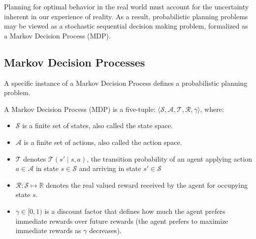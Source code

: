 \documentclass[11pt]{article}
\begin{document}
%
%
%
%
%

Planning for optimal behavior in the real world must account for the uncertainty inherent in our experience of reality. As a result, probabilistic planning problems may be viewed as a stochastic sequential decision making problem, formalized as a Markov Decision Process (MDP).

\subsection{Markov Decision Processes}

A specific instance of a Markov Decision Process defines a probabilistic planning problem. \\

{ A \textup{Markov Decision Process (MDP)} is a five-tuple: $\langle \mathcal{S},
\mathcal{A}, \mathcal{T}, \mathcal{R}, \gamma \rangle$, where:
\begin{itemize}
\item $\mathcal{S}$ is a finite set of states, also called the \textup{state space}.
\item $\mathcal{A}$ is a finite set of actions, also called the \textup{action space}.
\item $\mathcal{T}$ denotes $\mathcal{T}(s' \mid s,a)$, the
transition probability of an agent applying action $a \in \mathcal{A}$
in state $s \in \mathcal{S}$ and arriving in state $s' \in \mathcal{S}$
\item $\mathcal{R} : \mathcal{S}\mapsto \mathbb{R}$ denotes the real valued reward received by the agent for occupying state $s$.
\item $\gamma \in [0, 1)$ is a discount factor that defines how much the
  agent prefers immediate rewards over future rewards (the agent
  prefers to maximize immediate rewards as $\gamma$ decreases).
\end{itemize}}
\end{document}
